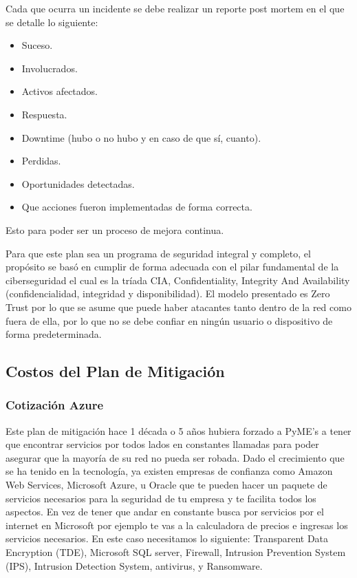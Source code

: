 \documentclass[10pt]{article}
\begin{document}
Cada que ocurra un incidente se debe realizar un reporte post mortem en el que se detalle lo siguiente: 

\begin{itemize}
    \item Suceso.
    \item Involucrados.
    \item Activos afectados.
    \item Respuesta.
    \item Downtime (hubo o no hubo y en caso de que sí, cuanto).
    \item Perdidas.
    \item Oportunidades detectadas.
    \item Que acciones fueron implementadas de forma correcta.
\end{itemize}

Esto para poder ser un proceso de mejora continua.

 Para que este plan sea un programa de seguridad integral y completo, el propósito se basó en cumplir de forma adecuada con el pilar fundamental de la ciberseguridad el cual es la tríada CIA, Confidentiality, Integrity And Availability (confidencialidad, integridad y disponibilidad). 
 El modelo presentado es Zero Trust por lo que se asume que puede haber atacantes tanto dentro de la red como fuera de ella, por lo que no se debe confiar en ningún usuario o dispositivo de forma predeterminada.

\subsection{Costos del Plan de Mitigación}
\subsubsection{Cotización Azure}
Este plan de mitigación hace 1 década o 5 años hubiera forzado a PyME's a tener que encontrar servicios por todos lados en constantes llamadas para poder asegurar que la mayoría de su red no pueda ser robada. Dado el crecimiento que se ha tenido en la tecnología, ya existen empresas de confianza como Amazon Web Services, Microsoft Azure, u Oracle que te pueden hacer un paquete de servicios necesarios para la seguridad de tu empresa y te facilita todos los aspectos. En vez de tener que andar en constante busca por servicios por el internet en Microsoft por ejemplo te vas a la calculadora de precios e ingresas los servicios necesarios. En este caso necesitamos lo siguiente: Transparent Data Encryption (TDE), Microsoft SQL server, Firewall, Intrusion Prevention System (IPS), Intrusion Detection System, antivirus, y Ransomware.  
\end{document}
